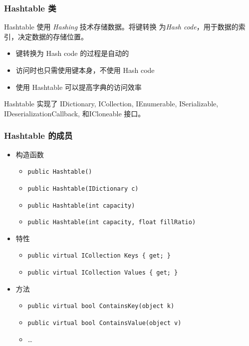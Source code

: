 \begin{frame}
\frametitle{Hashtable 类}

\CJKindent Hashtable 使用 \textit{Hashing} 技术存储数据。将键转换
为\textit{Hash code}，用于数据的索引，决定数据的存储位置。

\begin{itemize}
\item 键转换为 Hash code 的过程是自动的
\item 访问时也只需使用键本身，不使用 Hash code
\item 使用 Hashtable 可以提高字典的访问效率
\end{itemize}

\CJKindent Hashtable 实现了 IDictionary, ICollection, IEnumerable,
ISerializable, IDeserializationCallback, 和ICloneable 接口。
\end{frame}

\begin{frame}
\frametitle{Hashtable 的成员}
\begin{itemize}
\item 构造函数
\begin{itemize}
\item \small \texttt{public Hashtable()}
\item \small \texttt{public Hashtable(IDictionary c)}
\item \small \texttt{public Hashtable(int capacity)}
\item \small \texttt{public Hashtable(int capacity, float fillRatio)}
\end{itemize}
\item 特性
\begin{itemize}
\item \small \texttt{public virtual ICollection Keys \{ get; \}}
\item \small \texttt{public virtual ICollection Values \{ get; \}}
\end{itemize}
\item 方法
\begin{itemize}
\item \texttt{public virtual bool ContainsKey(object k)}
\item \texttt{public virtual bool ContainsValue(object v)}
\item \dots
\end{itemize}
\end{itemize}

\end{frame}

